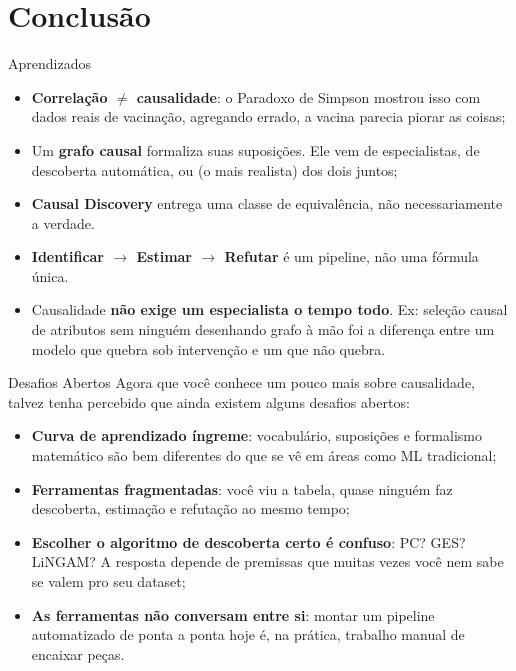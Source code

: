 \section{Conclusão}

\begin{frame}{Aprendizados}
	\begin{itemize}
		\item \textbf{Correlação $\neq$ causalidade}: o Paradoxo de Simpson mostrou isso com dados reais de vacinação, agregando errado, a vacina parecia piorar as coisas;
		\pause
		\item Um \textbf{grafo causal} formaliza suas suposições. Ele vem de especialistas, de descoberta automática, ou (o mais realista) dos dois juntos;
		\pause
		\item \textbf{Causal Discovery} entrega uma classe de equivalência, não necessariamente a verdade.
		\pause
		\item \textbf{Identificar $\to$ Estimar $\to$ Refutar} é um pipeline, não uma fórmula única.
		\pause
		\item Causalidade \textbf{não exige um especialista o tempo todo}. Ex: seleção causal de atributos sem ninguém desenhando grafo à mão foi a diferença entre um modelo que quebra sob intervenção e um que não quebra.
	\end{itemize}
\end{frame}

\begin{frame}{Desafios Abertos}
	Agora que você conhece um pouco mais sobre causalidade, talvez tenha percebido que ainda existem alguns desafios abertos:

	\begin{itemize}
		\item \textbf{Curva de aprendizado íngreme}: vocabulário, suposições e formalismo matemático são bem diferentes do que se vê em áreas como ML tradicional;
		\pause
		\item \textbf{Ferramentas fragmentadas}: você viu a tabela, quase ninguém faz descoberta, estimação e refutação ao mesmo tempo;
		\pause
		\item \textbf{Escolher o algoritmo de descoberta certo é confuso}: PC? GES? LiNGAM? A resposta depende de premissas que muitas vezes você nem sabe se valem pro seu dataset;
		\pause
		\item \textbf{As ferramentas não conversam entre si}: montar um pipeline automatizado de ponta a ponta hoje é, na prática, trabalho manual de encaixar peças.
	\end{itemize}
\end{frame}

